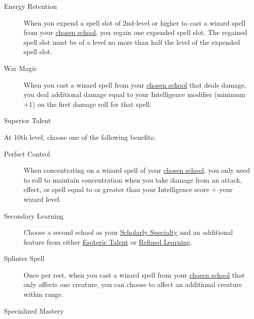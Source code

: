 \begin{description}
\item[Energy Retention]
When you expend a spell slot of 2nd-level or higher to cast a wizard
spell from your
\hyperref[wizard-subclass-arcanist-scholarly-speciality]{chosen school},
you regain one expended spell slot. The regained spell slot must be of a
level no more than half the level of the expended spell slot.
\end{description}

\begin{description}
\item[War Magic]
When you cast a wizard spell from your
\hyperref[wizard-subclass-arcanist-scholarly-speciality]{chosen school}
that deals damage, you deal additional damage equal to your Intelligence
modifier (minimum +1) on the first damage roll for that spell.
\end{description}

Superior Talent

At 10th level, choose one of the following benefits:

\begin{description}
\item[Perfect Control]
When concentrating on a wizard spell of your
\hyperref[wizard-subclass-arcanist-scholarly-speciality]{chosen school},
you only need to roll to maintain concentration when you take damage
from an attack, effect, or spell equal to or greater than your
Intelligence score + your wizard level.
\end{description}

\begin{description}
\item[Secondary Learning]
Choose a second school as your
\hyperref[wizard-subclass-arcanist-scholarly-speciality]{Scholarly
Specialty} and an additional feature from either
\hyperref[wizard-subclass-arcanist-esoteric-talent]{Esoteric Talent} or
\hyperref[wizard-subclass-arcanist-refined-learning]{Refined Learning}.
\end{description}

\begin{description}
\item[Splinter Spell]
Once per rest, when you cast a wizard spell from your
\hyperref[wizard-subclass-arcanist-scholarly-speciality]{chosen school}
that only affects one creature, you can choose to affect an additional
creature within range.
\end{description}

Specialized Mastery

